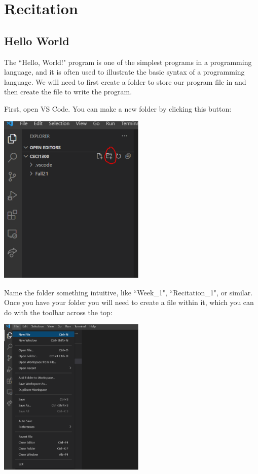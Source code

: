 \section{Recitation}

\subsection{Hello World}

The ``Hello, World!" program is one of the simplest programs in a programming language, and it is often used to illustrate the basic syntax of a programming language. We will need to first create a folder to store our program file in and then create the file to write the program.

First, open VS Code. You can make a new folder by clicking this button: 

\includegraphics[width=7cm]{images/hello_world_2.png}

Name the folder something intuitive, like ``Week\_1", ``Recitation\_1", or similar. Once you have your folder you will need to create a file within it, which you can do with the toolbar across the top:

\includegraphics[width=7cm]{images/hello_world_4.png}

